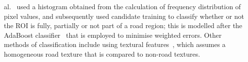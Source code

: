 al.~\cite{alkhorshid_road_2016} used a histogram obtained from the calculation of frequency distribution of pixel values, and subsequently used candidate training to classify whether or not the ROI is fully, partially or not part of a road region; this is modelled after the AdaBoost classifier~\cite{yoav_freund_decision-theoretic_1997} that is employed to minimise weighted errors. Other methods of classification include using textural features~\cite{xiao_monocular_2016,s._strygulec_road_2013}, which assumes a homogeneous road texture that is compared to non-road textures. 


